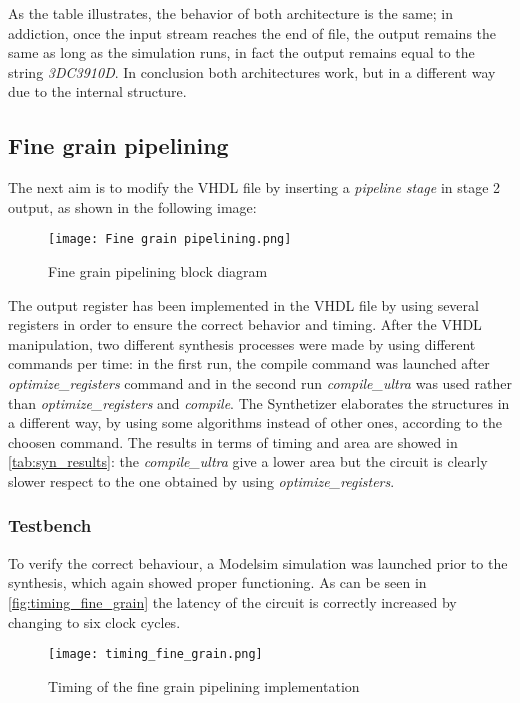 As the table illustrates, the behavior of both architecture is the same; in addiction, once the input stream reaches the end of file, the output remains the same as long as the simulation runs, in fact the output remains equal to the string \textit{3DC3910D}. In conclusion both architectures work, but in a different way due to the internal structure.


\subsection{Fine grain pipelining}
The next aim is to modify the VHDL file by inserting a \textit{pipeline stage} in stage 2 output, as shown in the following image:
\begin{figure}[H]
	\center
	\texttt{[image: Fine grain pipelining.png]}
	\caption{Fine grain pipelining block diagram}
	\label{fig:mult_struct}
\end{figure}
The output register has been implemented in the VHDL file by using several registers in order to ensure the correct behavior and timing.  After the VHDL manipulation, two different synthesis processes were made by using different commands per time: in the first run, the compile command was launched after \textit{optimize\_registers} command and in the second run  \textit{compile\_ultra} was used rather than \textit{optimize\_registers} and \textit{compile}. The Synthetizer elaborates the structures in a different way, by using some algorithms instead of other ones, according to the choosen command. The results in terms of timing and area are showed in \autoref{tab:syn_results}: the \textit{compile\_ultra} give a lower area but the circuit is clearly slower respect to the one obtained by using \textit{optimize\_registers}.

\subsubsection{Testbench}
To verify the correct behaviour, a Modelsim simulation was launched prior to the synthesis, which again showed proper functioning. As can be seen in \autoref{fig:timing_fine_grain} the latency of the circuit is correctly increased by changing to six clock cycles.

\begin{figure}[h]
	\center
	\texttt{[image: timing\_fine\_grain.png]}
	\caption{Timing of the fine grain pipelining implementation}
	\label{fig:timing_fine_grain}
\end{figure}


